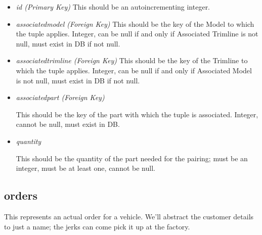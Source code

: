 \documentclass[11pt,letterpaper,oneside]{amsart}
\begin{document}
\begin{itemize}

\item \emph{id (Primary Key)}
	This should be an autoincrementing integer.
	
\item \emph{associated{\textunderscore}model (Foreign Key)}
	This should be the key of the Model to which the tuple applies.  Integer, can be null if and only if Associated Trimline is not null, must exist in DB if not null.
	
\item \emph{associated{\textunderscore}trimline (Foreign Key)}
	This should be the key of the Trimline to which the tuple applies.  Integer, can be null if and only if Associated Model is not null, must exist in DB if not null.
	
\item \emph{associated{\textunderscore}part (Foreign Key)}

	This should be the key of the part with which the tuple is associated.  Integer, cannot be null, must exist in DB.
	
\item \emph{quantity}

	This should be the quantity of the part needed for the pairing; must be an integer, must be at least one, cannot be null.

	
\end{itemize}

\subsection*{orders}

This represents an actual order for a vehicle.  We'll abstract the customer details to just a name; the jerks can come pick it up at the factory.
\end{document}
